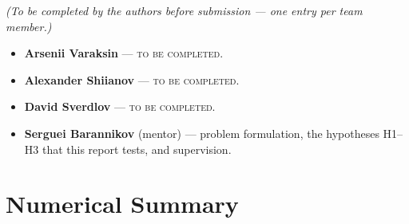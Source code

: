 \documentclass{zapiski}
\begin{document}
\emph{(To be completed by the authors before submission --- one entry per team member.)}

\begin{itemize}
\item \textbf{Arsenii Varaksin} --- \textsc{to be completed}.
\item \textbf{Alexander Shiianov} --- \textsc{to be completed}.
\item \textbf{David Sverdlov} --- \textsc{to be completed}.
\item \textbf{Serguei Barannikov} (mentor) --- problem formulation, the hypotheses H1--H3 that
this report tests, and supervision.
\end{itemize}

\appendix

\section{Numerical Summary}
\end{document}
